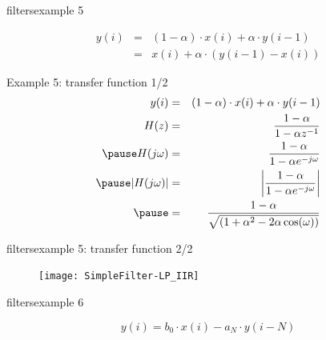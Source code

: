 	\begin{frame}{filters}{example 5}
	        \begin{figure}[!hbt]
				\begin{center}
                
				\end{center}
	        \end{figure}
            \pause
        	\begin{eqnarray*}
        		y(i) &=& (1-\alpha)\cdot x(i) + \alpha\cdot y(i-1)\\
        			&=& x(i) + \alpha \cdot (y(i-1) - x(i))
        	\end{eqnarray*}
	\end{frame}
	
	\begin{frame}{Example 5: transfer function 1/2}
    	\begin{eqnarray*}
        		y(i) &=& (1-\alpha)\cdot x(i) + \alpha\cdot y(i-1)\\
        		H(z) &=& \frac{1-\alpha}{1-\alpha z^{-1}}\\
        \pause
        		H(j\omega) &=& \frac{1-\alpha}{1-\alpha e^{-j\omega}}\\
        \pause
        		|H(j\omega)| &=& \left|\frac{1-\alpha}{1-\alpha e^{-j\omega}}\right| \\
        \pause
        		&=&\frac{1-\alpha}{\sqrt{\left(1 + \alpha^2 - 2\alpha\cos(\omega)\right)}} 
    	\end{eqnarray*}
	\end{frame}
	\begin{frame}{filters}{example 5: transfer function 2/2}
		\begin{figure}
			\centerline{\texttt{[image: SimpleFilter-LP\_IIR]}}
		\end{figure}
	\end{frame}
	\begin{frame}{filters}{example 6}
        \begin{figure}[!hbt]
			\begin{center}
                
			\end{center}
        \end{figure}
    	\begin{equation*}
    		y(i) = b_0\cdot x(i) - a_N\cdot y(i-N)
    	\end{equation*}
	\end{frame}
